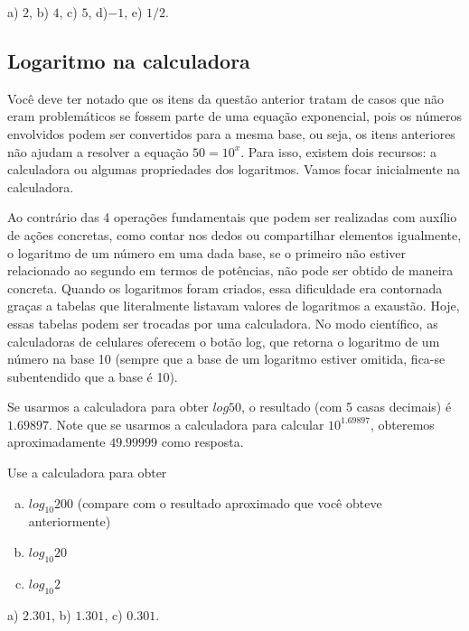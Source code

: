 \documentclass[main.tex]{subfiles}
\begin{document}
\begin{gabarito}
	\begin{gabaritoQuestao}
		a) $2$, b) $4$, c) $5$, d)$-1$, e) $1/2$.
	\end{gabaritoQuestao}
\end{gabarito}

\subsection*{Logaritmo na calculadora}

Você deve ter notado que os itens da questão anterior tratam de casos que não eram problemáticos se fossem parte de uma equação exponencial, pois os números envolvidos podem ser convertidos para a mesma base, ou seja, os itens anteriores não ajudam a resolver a equação $50=10^x$. Para isso, existem dois recursos: a calculadora ou algumas propriedades dos logaritmos. Vamos focar inicialmente na calculadora.

Ao contrário das 4 operações fundamentais que podem ser realizadas com auxílio de ações concretas, como contar nos dedos ou compartilhar elementos igualmente, o logaritmo de um número em uma dada base, se o primeiro não estiver relacionado ao segundo em termos de potências, não pode ser obtido de maneira concreta. Quando os logaritmos foram criados, essa dificuldade era contornada graças a tabelas que literalmente listavam valores de logaritmos a exaustão. Hoje, essas tabelas podem ser trocadas por uma calculadora. No modo científico, as calculadoras de celulares oferecem o botão log, que retorna o logaritmo de um número na base 10 (sempre que a base de um logaritmo estiver omitida, fica-se subentendido que a base é 10).

Se usarmos a calculadora para obter $log 50$, o resultado (com 5 casas decimais) é $1.69897$. Note que se usarmos a calculadora para calcular $10^1.69897$, obteremos aproximadamente $49.99999$ como resposta.

\begin{questao}
Use a calculadora para obter
\begin{enumerate}[a)]
\item $log_{10} 200$ (compare com o resultado aproximado que você obteve anteriormente)
\item $log_{10} 20$
\item $log_{10} 2$
\end{enumerate}
\end{questao}

\begin{gabarito}
	\begin{gabaritoQuestao}
		a) $2.301$, b) $1.301$, c) $0.301$.
	\end{gabaritoQuestao}
\end{gabarito}
\end{document}
